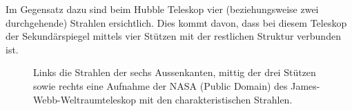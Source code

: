 Im Gegensatz dazu sind beim Hubble Teleskop vier (beziehungsweise zwei durchgehende) Strahlen ersichtlich.
Dies kommt davon, dass bei diesem Teleskop der Sekundärspiegel mittels vier Stützen mit der restlichen Struktur verbunden ist.

\begin{figure}
    \centering

    \hfill
    \hfill
    \caption{Links die Strahlen der sechs Aussenkanten, mittig der drei Stützen sowie rechts eine Aufnahme der NASA (Public Domain)
        des James-Webb-Weltraumteleskop mit den charakteristischen Strahlen.}
    \label{opt:fig:jwst}
\end{figure}
